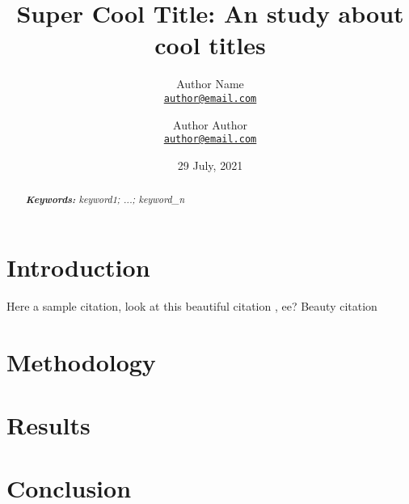 \documentclass[11pt]{article}
\title{Super Cool Title: An study about cool titles}
\author{Author Name\\
	\href{mailto:author@email.com}{\texttt{author@email.com}}
	\and Author Author\\
	\href{mailto:author@email.com}{\texttt{author@email.com}}
	\and 
}
\date{29 July, 2021}
\begin{document}
	
	{
		\maketitle
		
		\begin{abstract}
			
			\lipsum[1]
			
			
			\noindent
			\textit{\textbf{Keywords: }
				keyword1; ...; keyword\_n} \\ 
			
		\end{abstract}
	}
	
	
	\section{Introduction}
	
	
	\lipsum[2] 
	Here a sample citation, look at this beautiful citation \citet{DBLP:journals/corr/abs-2002-00819}, ee? Beauty citation
	
	
	\section{Methodology}
	
	
	\lipsum[3]
	
	
	\section{Results}
	
	
	\lipsum[4] 
	

	\section{Conclusion}

	
	\lipsum[5]
	
	\medskip
	
	 
	
	\newpage
	
	
\end{document}
